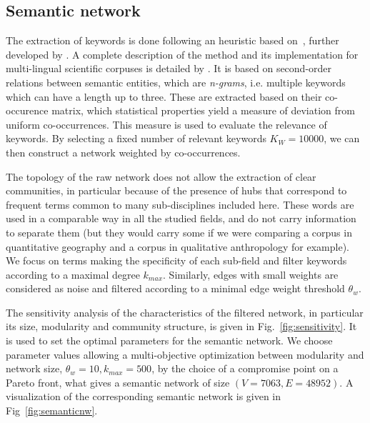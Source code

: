 \documentclass[10pt]{article}
\begin{document}
\subsection{Semantic network}

The extraction of keywords is done following an heuristic based on~\cite{chavalarias2013phylomemetic}, further developed by \cite{bergeaud2017classifying}. A complete description of the method and its implementation for multi-lingual scientific corpuses is detailed by \cite{raimbault2019exploration}. It is based on second-order relations between semantic entities, which are \emph{n-grams}, i.e. multiple keywords which can have a length up to three. These are extracted based on their co-occurence matrix, which statistical properties yield a measure of deviation from uniform co-occurrences. This measure is used to evaluate the relevance of keywords. By selecting a fixed number of relevant keywords $K_W = 10000$, we can then construct a network weighted by co-occurrences.

The topology of the raw network does not allow the extraction of clear communities, in particular because of the presence of hubs that correspond to frequent terms common to many sub-disciplines included here. These words are used in a comparable way in all the studied fields, and do not carry information to separate them (but they would carry some if we were comparing a corpus in quantitative geography and a corpus in qualitative anthropology for example). We focus on terms making the specificity of each sub-field and filter keywords according to a maximal degree $k_{max}$. Similarly, edges with small weights are considered as noise and filtered according to a minimal edge weight threshold $\theta_w$.

The sensitivity analysis of the characteristics of the filtered network, in particular its size, modularity and community structure, is given in Fig.~\ref{fig:sensitivity}. It is used to set the optimal parameters for the semantic network. We choose parameter values allowing a multi-objective optimization between modularity and network size, $\theta_w = 10,k_{max} = 500$, by the choice of a compromise point on a Pareto front, what gives a semantic network of size $(V=7063,E=48952)$. A visualization of the corresponding semantic network is given in Fig~\ref{fig:semanticnw}.
\end{document}
